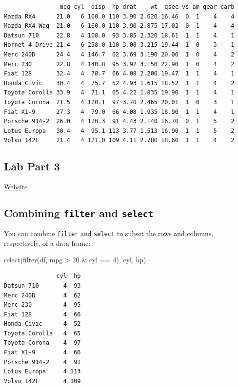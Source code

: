 \documentclass[
]{article}
\newenvironment{Shaded}{\begin{snugshade}}{\end{snugshade}}
\newcommand{\DecValTok}[1]{\textcolor[rgb]{0.00,0.00,0.81}{#1}}
\newcommand{\FunctionTok}[1]{\textcolor[rgb]{0.00,0.00,0.00}{#1}}
\newcommand{\NormalTok}[1]{#1}
\newcommand{\SpecialCharTok}[1]{\textcolor[rgb]{0.00,0.00,0.00}{#1}}
\begin{document}
\begin{verbatim}
                mpg cyl  disp  hp drat    wt  qsec vs am gear carb
Mazda RX4      21.0   6 160.0 110 3.90 2.620 16.46  0  1    4    4
Mazda RX4 Wag  21.0   6 160.0 110 3.90 2.875 17.02  0  1    4    4
Datsun 710     22.8   4 108.0  93 3.85 2.320 18.61  1  1    4    1
Hornet 4 Drive 21.4   6 258.0 110 3.08 3.215 19.44  1  0    3    1
Merc 240D      24.4   4 146.7  62 3.69 3.190 20.00  1  0    4    2
Merc 230       22.8   4 140.8  95 3.92 3.150 22.90  1  0    4    2
Fiat 128       32.4   4  78.7  66 4.08 2.200 19.47  1  1    4    1
Honda Civic    30.4   4  75.7  52 4.93 1.615 18.52  1  1    4    2
Toyota Corolla 33.9   4  71.1  65 4.22 1.835 19.90  1  1    4    1
Toyota Corona  21.5   4 120.1  97 3.70 2.465 20.01  1  0    3    1
Fiat X1-9      27.3   4  79.0  66 4.08 1.935 18.90  1  1    4    1
Porsche 914-2  26.0   4 120.3  91 4.43 2.140 16.70  0  1    5    2
Lotus Europa   30.4   4  95.1 113 3.77 1.513 16.90  1  1    5    2
Volvo 142E     21.4   4 121.0 109 4.11 2.780 18.60  1  1    4    2
\end{verbatim}

\hypertarget{lab-part-3}{%
\subsection{Lab Part 3}\label{lab-part-3}}

\href{http://https://jhudatascience.org/intro_to_R_class/index.html}{Website}

\hypertarget{combining-filter-and-select}{%
\subsection{\texorpdfstring{Combining \texttt{filter} and
\texttt{select}}{Combining filter and select}}\label{combining-filter-and-select}}

You can combine \texttt{filter} and \texttt{select} to subset the rows
and columns, respectively, of a data frame:

\begin{Shaded}
\begin{Highlighting}[]
\FunctionTok{select}\NormalTok{(}\FunctionTok{filter}\NormalTok{(df, mpg }\SpecialCharTok{\textgreater{}} \DecValTok{20} \SpecialCharTok{\&}\NormalTok{ cyl }\SpecialCharTok{==} \DecValTok{4}\NormalTok{), cyl, hp)}
\end{Highlighting}
\end{Shaded}

\begin{verbatim}
               cyl  hp
Datsun 710       4  93
Merc 240D        4  62
Merc 230         4  95
Fiat 128         4  66
Honda Civic      4  52
Toyota Corolla   4  65
Toyota Corona    4  97
Fiat X1-9        4  66
Porsche 914-2    4  91
Lotus Europa     4 113
Volvo 142E       4 109
\end{verbatim}
\end{document}
